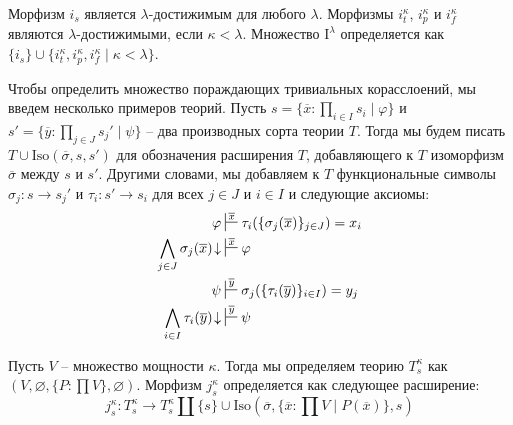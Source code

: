 \documentclass[reqno]{amsart}
\theoremstyle{definition}
\theoremstyle{remark}
\newcommand{\fs}[1]{\mathrm{#1}}
\newcommand{\I}{\mathrm{I}}
\begin{document}
Морфизм $i_s$ является $\lambda$-достижимым для любого $\lambda$.
Морфизмы $i_t^\kappa$, $i_p^\kappa$ и $i_f^\kappa$ являются $\lambda$-достижимыми, если $\kappa < \lambda$.
Множество $\I^\lambda$ определяется как $\{ i_s \} \cup \{ i_t^\kappa, i_p^\kappa, i_f^\kappa \mid \kappa < \lambda \}$.

Чтобы определить множество пораждающих тривиальных корасслоений, мы введем несколько примеров теорий.
Пусть $s = \{ \overline{x} : \prod_{i \in I} s_i \mid \varphi \}$ и $s' = \{ \overline{y} : \prod_{j \in J} s_j' \mid \psi \}$ -- два производных сорта теории $T$.
Тогда мы будем писать $T \cup \fs{Iso}(\overline{\sigma},s,s')$ для обозначения расширения $T$, добавляющего к $T$ изоморфизм $\overline{\sigma}$ между $s$ и $s'$.
Другими словами, мы добавляем к $T$ функциональные символы $\sigma_j : s \to s_j'$ и $\tau_i : s' \to s_i$ для всех $j \in J$ и $i \in I$ и следующие аксиомы:
\begin{align*}
\varphi & \sststile{}{\overline{x}} \tau_i(\{ \sigma_j(\overline{x}) \}_{j \in J}) = x_i \\
\bigwedge_{j \in J} \sigma_j(\overline{x})\!\downarrow & \sststile{}{\overline{x}} \varphi \\
\psi & \sststile{}{\overline{y}} \sigma_j(\{ \tau_i(\overline{y}) \}_{i \in I}) = y_j \\
\bigwedge_{i \in I} \tau_i(\overline{y})\!\downarrow & \sststile{}{\overline{y}} \psi
\end{align*}

Пусть $V$ -- множество мощности $\kappa$.
Тогда мы определяем теорию $T^\kappa_s$ как $(V, \varnothing, \{ P : \prod V \}, \varnothing)$.
Морфизм $j^\kappa_s$ определяется как следующее расширение:
\[ j^\kappa_s : T^\kappa_s \to T^\kappa_s \amalg \{ s \} \cup \fs{Iso}(\overline{\sigma}, \{ \overline{x} : \prod V \mid P(\overline{x}) \}, s) \]
\end{document}
